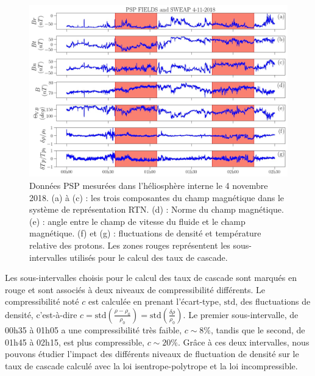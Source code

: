 \begin{figure}[!ht]
 \centering
\includegraphics[width=\linewidth,trim=0cm 0cm 0cm 0cm, clip=false]{./Part_1/images/Fig_04112018H_00_panel}
\caption{Données \ac{PSP} mesurées dans l'héliosphère interne le 4 novembre 2018. (a) à (c) : les trois composantes du champ magnétique dans le système de représentation \acs{RTN}. (d) : Norme du champ magnétique. (e) : angle entre le champ de vitesse du fluide et le champ magnétique. (f) et (g) : fluctuations de densité et température relative des protons. Les zones rouges représentent les sous-intervalles utilisés pour le calcul des taux de cascade.}
\label{fig:data_PSP}
\end{figure}

Les sous-intervalles choisis pour le calcul des taux de cascade sont marqués en rouge et sont associés à deux niveaux de compressibilité différents. Le compressibilité noté $c$ est calculée en prenant l'écart-type, $\text{std}$, des fluctuations de densité, c'est-à-dire $c = \text{std}(\frac{\rho - \rho_0}{\rho_0}) = \text{std}(\frac{\delta \rho}{\rho_0})$. Le premier sous-intervalle, de 00h35 à 01h05 a une compressibilité très faible, $c \sim 8\%$, tandis que le second, de 01h45 à 02h15, est plus compressible, $c \sim 20\%$. Grâce à ces deux intervalles, nous pouvons étudier l'impact des différents niveaux de fluctuation de densité sur le taux de cascade calculé avec la loi isentrope-polytrope et la loi incompressible.


